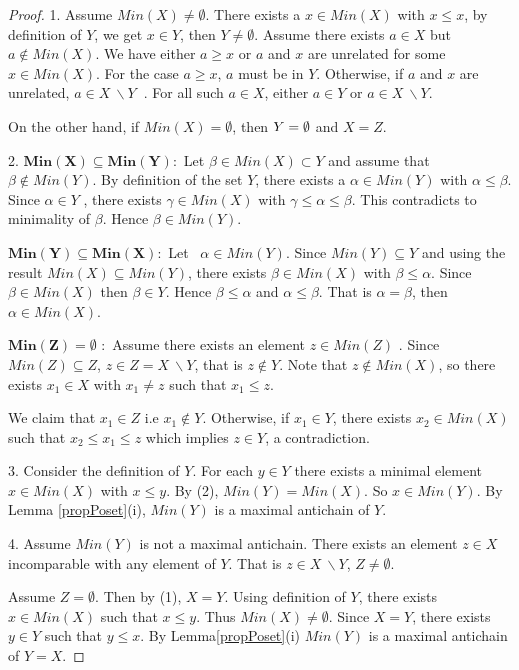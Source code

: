 \documentclass[12pt]{article}
\begin{document}
\begin{proof}
1. Assume $Min(X)\neq \emptyset $. There exists a $x\in Min(X)$ with $x\leq
x $, by definition of $Y$, we get $x \in Y$, then $Y\neq \emptyset$. Assume
there exists $a\in X$ but $a\notin Min(X)$. We have either $a\geq x$ or $a$
and $x$ are unrelated for some $x\in Min(X)$. For the case $a\geq x$, $a$
must be in $Y.$ Otherwise, if $a$ and $x$ are unrelated, $a\in X\ \backslash
Y$\textbf{\ }. For all such $a\in X$, either $a\in Y$ or $a\in X\ \backslash
Y$.

On the other hand, if $Min(X)=\mathbf{\emptyset }$, then $Y=\mathbf{%
\emptyset }$ and $X=Z$.

2. $\mathbf{Min(X)\subseteq Min(Y)}:$ Let $\beta \in Min(X)\subset Y$ and
assume that $\beta \notin Min(Y)$. By definition of the set $Y$, there
exists a $\alpha \in Min(Y)$ with $\alpha \leq \beta $. Since $\alpha \in Y$%
, there exists $\gamma \in Min(X)$ with $\gamma \leq \alpha \leq \beta $.
This contradicts to minimality of $\beta $. Hence $\beta \in Min(Y)$.

$\mathbf{Min(Y)\subseteq Min(X)}:$ Let \ $\alpha \in Min(Y)$. Since $%
Min(Y)\subseteq Y$ and using the result $Min(X)\subseteq Min(Y)$, there
exists $\beta \in Min(X)$ with $\beta \leq \alpha $. Since $\beta \in Min(X)$
then $\beta \in Y$. Hence $\beta \leq \alpha $ and $\alpha \leq \beta $.
That is $\alpha =\beta $, then $\alpha \in Min(X)$.

$\mathbf{Min(Z)=\emptyset }$ $:$ Assume there exists an element $z\in Min(Z)$%
. Since $Min(Z)\subseteq Z$, $z\in Z=X\ \backslash Y$, that is $z\notin Y$.
Note that $z\notin Min(X)$, so there exists $x_{1}\in X$ with $x_{1}\neq z$
such that $x_{1}\leq z.$

We claim that $x_{1}\in Z$ i.e $x_{1}\notin Y$. Otherwise, if $x_{1}\in Y$,
there exists $x_{2}\in Min(X)$ such that $x_{2}\leq x_{1}\leq z$ which
implies $z\in Y$, a contradiction.

3. Consider the definition of $Y$. For each $y\in Y$ there exists a minimal
element $x\in Min(X)$ with $x\leq y$. By (2), $Min(Y)=Min(X)$. So $x\in
Min(Y)$. By Lemma \ref{propPoset}(i), $Min(Y)$ is a maximal antichain of $Y.$

4. Assume $Min(Y)$ is not a maximal antichain. There
exists an element $z\in X$ incomparable with any element of $Y$. That is $%
z\in X\ \backslash Y$, $Z\neq \mathbf{\emptyset }$.

Assume $Z=\mathbf{\emptyset }$. Then by (1), $X=Y$.
Using definition of $Y$, there exists $x\in Min(X)$ such that $x\leq y$.
Thus $Min(X)\neq \mathbf{\emptyset }$. Since $X=Y$, there exists $y\in Y$
such that $y\leq x$. By Lemma\ref{propPoset}(i) $Min(Y)$ is a maximal
antichain of $Y=X$.
\end{proof}
\end{document}
